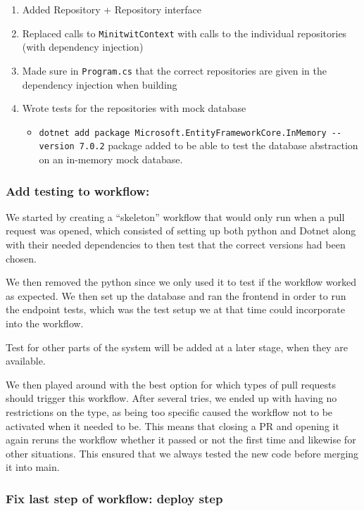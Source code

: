\begin{enumerate}
    \item Added Repository + Repository interface
    \item Replaced calls to \texttt{MinitwitContext} with calls to the individual repositories (with dependency injection)
    \item Made sure in \texttt{Program.cs} that the correct repositories are given in the dependency injection when building
    \item Wrote tests for the repositories with mock database

    \begin{itemize}
        \item \texttt{dotnet\ add\ package\ Microsoft.EntityFrameworkCore.InMemory\ -\/-version\ 7.0.2} package added to be able to test the database abstraction on an in-memory mock database.
    \end{itemize}
\end{enumerate}

\subsubsection{Add testing to workflow:}
\label{log:add-testing-to-workflow}

We started by creating a ``skeleton'' workflow that would only run when a pull request was opened, which consisted of setting up both python and Dotnet along with their needed dependencies to then test that the correct versions had been chosen.

We then removed the python since we only used it to test if the workflow worked as expected. We then set up the database and ran the frontend in order to run the endpoint tests, which was the test setup we at that time could incorporate into the workflow.

Test for other parts of the system will be added at a later stage, when they are available.

We then played around with the best option for which types of pull requests should trigger this workflow. After several tries, we ended up with having no restrictions on the type, as being too specific caused the workflow not to be activated when it needed to be. This means that closing a PR and opening it again reruns the workflow whether it passed or not the first time and likewise for other situations. This ensured that we always tested the new code before merging it into main.

\subsubsection{Fix last step of workflow: deploy step}
\label{log:fix-last-step-of-workflow-deploy-step}

